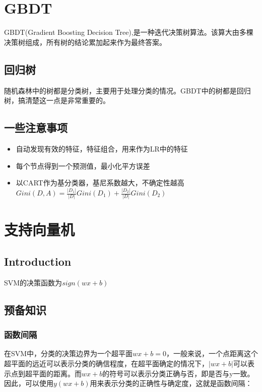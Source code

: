 	

	
	
	
\section{GBDT}	
	GBDT(Gradient Boosting Decision Tree),是一种迭代决策树算法。该算大由多棵决策树组成，所有树的结论累加起来作为最终答案。
	
	\subsection{回归树}
	随机森林中的树都是分类树，主要用于处理分类的情况。GBDT中的树都是回归树，搞清楚这一点是非常重要的。
	
	
	\subsection{一些注意事项}
	\begin{itemize}
		\item 自动发现有效的特征，特征组合，用来作为LR中的特征
		\item 每个节点得到一个预测值，最小化平方误差
		\item 以CART作为基分类器，基尼系数越大，不确定性越高$Gini(D,A) = \frac{|D_1|}{|D|} Gini(D_1)+ \frac{|D_2|}{|D|} Gini(D_2) $
	\end{itemize}	



\section{支持向量机}
	\subsection*{Introduction}
	SVM的决策函数为$sign(wx+b)$
	
	\subsection{预备知识}
		\subsubsection{函数间隔}
		在SVM中，分类的决策边界为一个超平面$wx+b=0$，一般来说，一个点距离这个超平面的远近可以表示分类的确信程度，在超平面确定的情况下，$|wx+b|$可以表示点到超平面的距离。而$wx+b$的符号可以表示分类正确与否，即是否与y一致。因此，可以使用$y(wx+b)$用来表示分类的正确性与确定度，这就是函数间隔：
		
